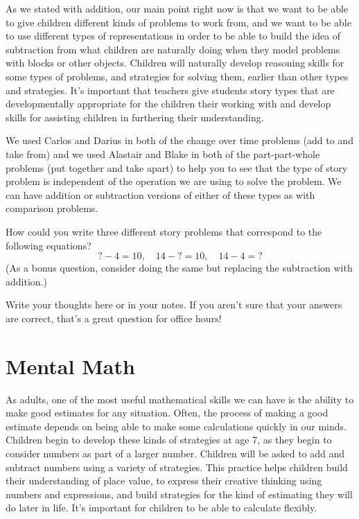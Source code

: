 \documentclass{ximera}
\begin{document}
As we stated with addition,  our main point right now is that we want to be able to give children different kinds of problems to work from, and we want to be able to use different types of representations in order to be able to build the idea of subtraction from what children are naturally doing when they model problems with blocks or other objects. Children will naturally develop reasoning skills for some types of problems, and strategies for solving them, earlier than other types and strategies. It's important that teachers give students story types that are developmentally appropriate for the children their working with and develop skills for assisting children in furthering their understanding.

We used Carlos and Darius in both of the change over time problems (add to and take from) and we used Alastair and Blake in both of the part-part-whole problems (put together and take apart) to help you to see that the type of story problem is independent of the operation we are using to solve the problem. We can have addition or subtraction versions of either of these types as with comparison problems.



\begin{question}
How could you write three different story problems that correspond to the following equations?
\[
? - 4 = 10, \quad 14 - ? = 10, \quad 14-4=?
\]
(As a bonus question, consider doing the same but replacing the subtraction with addition.)
\begin{freeResponse}
Write your thoughts here or in your notes. If you aren't sure that your answers are correct, that's a great question for office hours!
\end{freeResponse}
\end{question}



\section{Mental Math}

As adults, one of the most useful mathematical skills we can have is the ability to make good estimates for any situation. Often, the process of making a good estimate depends on being able to make some calculations quickly in our minds. Children begin to develop these kinds of strategies at age 7, as they begin to consider numbers as part of a larger number. Children will be asked to add and subtract numbers using a variety of strategies. This practice helps children build their understanding of place value, to express their creative thinking using numbers and expressions, and build strategies for the kind of estimating they will do later in life. It's important for children to be able to calculate flexibly.
\end{document}
